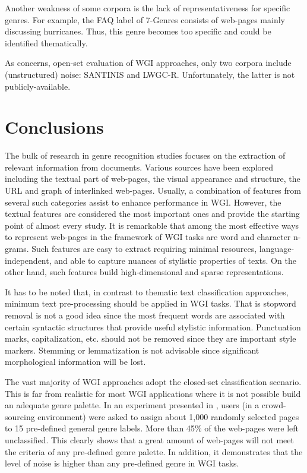 Another weakness of some corpora is the lack of representativeness for specific genres. For example, the FAQ label of 7-Genres consists of web-pages mainly discussing hurricanes. Thus, this genre becomes too specific and could be identified thematically. 

As concerns, open-set evaluation of WGI approaches, only two corpora include (unstructured) noise: SANTINIS and LWGC-R. Unfortunately, the latter is not publicly-available. 

\section{Conclusions}\label{chap:relevant_work:sec:intro}

The bulk of research in genre recognition studies focuses on the extraction of relevant information from documents. Various sources have been explored including the textual part of web-pages, the visual appearance and structure, the URL and graph of interlinked web-pages. Usually, a combination of features from several such categories assist to enhance performance in WGI. However, the textual features are considered the most important ones and provide the starting point of almost every study. It is remarkable that among the most effective ways to represent web-pages in the framework of WGI tasks are word and character n-grams. Such features are easy to extract requiring minimal resources, language-independent, and able to capture nuances of stylistic properties of texts. On the other hand, such features build high-dimensional and sparse representations.

It has to be noted that, in contrast to thematic text classification approaches, minimum text pre-processing should be applied in WGI tasks. That is stopword removal is not a good idea since the most frequent words are associated with certain syntactic structures that provide useful stylistic information. Punctuation marks, capitalization, etc. should not be removed since they are important style markers. Stemming or lemmatization is not advisable since significant morphological information will be lost.

The vast majority of WGI approaches adopt the closed-set classification scenario. This is far from realistic for most WGI applications where it is not possible build an adequate genre palette. In an experiment presented in \parencite{Asheghi2015}, users (in a crowd-sourcing environment) were asked to assign about 1,000 randomly selected pages to 15 pre-defined general genre labels. More than 45\% of the web-pages were left unclassified. This clearly shows that a great amount of web-pages will not meet the criteria of any pre-defined genre palette. In addition, it demonstrates that the level of noise is higher than any pre-defined genre in WGI tasks. 

